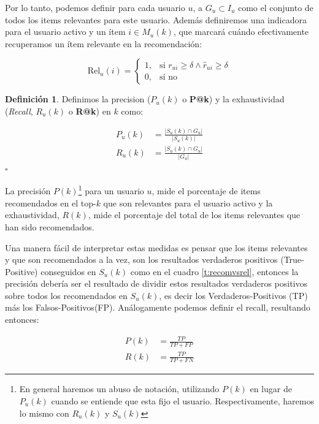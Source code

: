 \documentclass[hidelinks,12pt,a4paper]{book}
\theoremstyle{plain}
\theoremstyle{definition}
\newtheorem{definicion}[theorem]{Definición} %
\begin{document}
Por lo tanto, podemos definir para cada usuario $u$, a $G_u \subset I_u$ como el conjunto de todos los items relevantes para este usuario. Además definiremos una indicadora para el usuario activo y un ítem $i\in M_u(k)$, que marcará cuándo efectivamente recuperamos un ítem relevante en la recomendación:

\begin{equation*}
\text{Rel}_u(i) = 
\begin{cases}
1, &\text{si  } r_{ui} \geq \delta \wedge \hat{r}_{ui} \geq \delta \\
0, &\text{si no}
\end{cases}
\end{equation*}

\begin{definicion}
Definimos la precision ($P_{u}(k)$ o \textbf{P@k}) y la exhaustividad (\textit{Recall}, $R_{u}(k)$ o \textbf{R@k}) en $k$ como:

\begin{align}
P_{u}(k) &= \frac{|S_u(k) \cap G_u|}{|S_u(k)|} \\
R_{u}(k) &= \frac{|S_u(k) \cap G_u|}{|G_u|}
\end{align}
\hfill$\square$
\end{definicion}

La precisión $P(k)$\footnote{En general haremos un abuso de notación, utilizando $P(k)$ en lugar de $P_u(k)$ cuando se entiende que esta fijo el usuario. Respectivamente, haremos lo mismo con $R_u(k)$ y $S_u(k)$} para un usuario $u$, mide el porcentaje de items recomendados en el top-$k$ que son relevantes para el usuario activo y la exhaustividad, $R(k)$, mide el porcentaje del total de los items relevantes que han sido recomendados. 

Una manera fácil de interpretar estas medidas es pensar que los items relevantes y que son recomendados a la vez, son los resultados verdaderos positivos (True-Positive) conseguidos en $S_u(k)$ como en el cuadro \ref{t:recomvsrel}, entonces la precisión debería ser el resultado de dividir estos resultados verdaderos positivos sobre todos los recomendados en $S_u(k)$, es decir los Verdaderos-Positivos (TP) más los Falsos-Positivos(FP). Análogamente podemos definir el recall, resultando entonces:

\begin{align}
P(k) &= \frac{TP}{TP + FP} \\
R(k) &= \frac{TP}{TP + FN}
\end{align}
\end{document}
